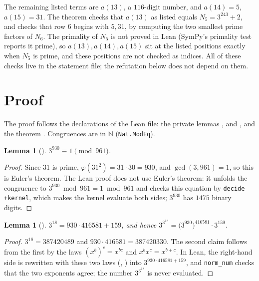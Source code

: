 \documentclass[11pt]{amsart}
\theoremstyle{plain}
\newtheorem{lemma}[theorem]{Lemma}
\theoremstyle{definition}
\newcommand{\N}{\mathbb{N}}
\begin{document}
The remaining listed terms are $a(13)$, a $116$-digit number, and $a(14)=5$, $a(15)=31$.
The theorem  checks that $a(13)$ as listed equals $N_5=3^{243}+2$, and  checks that row $6$ begins with $5,31$, by computing the two smallest prime factors of $N_6$.
The primality of $N_5$ is not proved in Lean (SymPy's primality test reports it prime), so $a(13),a(14),a(15)$ sit at the listed positions exactly when $N_5$ is prime, and these positions are not checked as indices.
All of these checks live in the statement file; the refutation below does not depend on them.

\section{Proof}\label{sec:proof}

The proof follows the declarations of the Lean file: the private lemmas ,  and , and the theorem .
Congruences are in $\N$ (\texttt{Nat.ModEq}).

\begin{lemma}[]\label{lem:euler}
$3^{930}\equiv1\pmod{961}$.
\end{lemma}

\begin{proof}
Since $31$ is prime, $\varphi(31^2)=31\cdot30=930$, and $\gcd(3,961)=1$, so this is Euler's theorem.
The Lean proof does not use Euler's theorem: it unfolds the congruence to $3^{930}\bmod 961=1\bmod 961$ and checks this equation by \texttt{decide +kernel}, which makes the kernel evaluate both sides; $3^{930}$ has $1475$ binary digits.
\end{proof}

\begin{lemma}[]\label{lem:split}
$3^{18}=930\cdot416581+159$, and hence $3^{3^{18}}=\bigl(3^{930}\bigr)^{416581}\cdot3^{159}$.
\end{lemma}

\begin{proof}
$3^{18}=387420489$ and $930\cdot416581=387420330$.
The second claim follows from the first by the laws $(x^b)^c=x^{bc}$ and $x^bx^c=x^{b+c}$.
In Lean, the right-hand side is rewritten with these two laws (, ) into $3^{930\cdot416581+159}$, and \texttt{norm\_num} checks that the two exponents agree; the number $3^{3^{18}}$ is never evaluated.
\end{proof}
\end{document}
